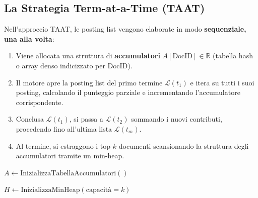 \subsection{La Strategia Term-at-a-Time (TAAT)}
Nell'approccio TAAT, le posting list vengono elaborate in modo \textbf{sequenziale, una alla volta}:
\begin{enumerate}
    \item Viene allocata una struttura di \textbf{accumulatori} $A[\text{DocID}] \in \mathbb{R}$ (tabella hash o array denso indicizzato per $\text{DocID}$).
    \item Il motore apre la posting list del primo termine $\mathcal{L}(t_1)$ e itera su tutti i suoi posting, calcolando il punteggio parziale e incrementando l'accumulatore corrispondente.
    \item Conclusa $\mathcal{L}(t_1)$, si passa a $\mathcal{L}(t_2)$ sommando i nuovi contributi, procedendo fino all'ultima lista $\mathcal{L}(t_m)$.
    \item Al termine, si estraggono i top-$k$ documenti scansionando la struttura degli accumulatori tramite un min-heap.
\end{enumerate}

\begin{algorithm}[H]
\caption{Term-at-a-Time (TAAT)}
\label{alg:taat}

$A \gets \text{InizializzaTabellaAccumulatori}()$ 


$H \gets \text{InizializzaMinHeap}(\text{capacit\`a}=k)$\;
\;
\end{algorithm}

